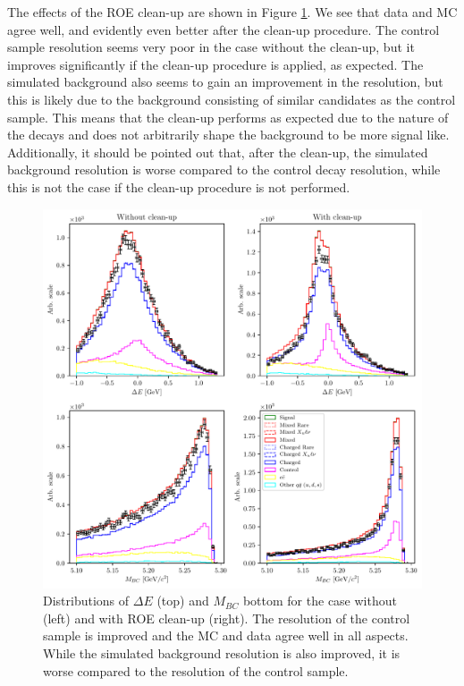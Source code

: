 The effects of the ROE clean-up are shown in Figure \ref{fig:roe_val}. We see that data and MC agree well, and evidently even better after the clean-up procedure. The control sample resolution seems very poor in the case without the clean-up, but it improves significantly if the clean-up procedure is applied, as expected. The simulated background also seems to gain an improvement in the resolution, but this is likely due to the background consisting of similar candidates as the control sample. This means that the clean-up performs as expected due to the nature of the decays and does not arbitrarily shape the background to be more signal like. Additionally, it should be pointed out that, after the clean-up, the simulated background resolution is worse compared to the control decay resolution, while this is not the case if the clean-up procedure is not performed.
\begin{figure}[!htb]
	\centering
	\captionsetup{width=0.8\linewidth}
	\includegraphics[width=\linewidth]{fig/roe_val}
	\caption{Distributions of $\Delta E$ (top) and $M_{BC}$ bottom for the case without (left) and with ROE clean-up (right). The resolution of the control sample is improved and the MC and data agree well in all aspects. While the simulated background resolution is also improved, it is worse compared to the resolution of the control sample.}
	\label{fig:roe_val}
\end{figure}

